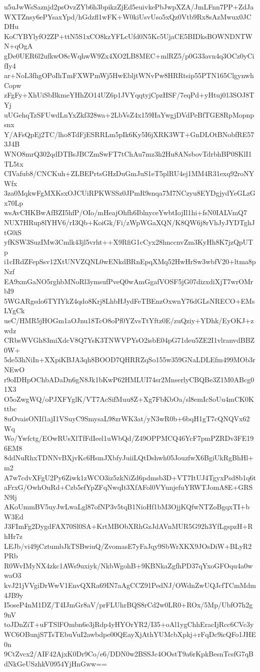 u5uJwWsSaznjd2psOvzZYb6h3bpikzZjEd5euivkePbJwpXZA/JmLFnn7PP+ZdJa
WXTZnsy6ePYsaxYpd/hGdzfl1wFK+W0kiUsvUso5xQz0Vtb9Rx8sAzMwux0JCDHu
KoCYBYlyfO2ZP+ttN5S1xCO8kzYFLcUfd0N5Kc5UjaCE5BIDksBOWNDNTWN+qOgA
gDe0UER6l2ufkwO8cWqhwW9Zx4XO2LB8MEC+mlRZ5/p0G33avn4q3OCz0yCifIy4
ar+NoL3fhgOPoIhTmFXWPmWj5HwEbljtWNvPw8HRRtsip55PTN165ClgynwhCopw
zFgFy+XhUiSbBkmeYHhZO14UZ6p1JVYqqtyjCpzHSF/7eqPd+yHtuj013SOJ8TYj
uUGehqTzSFUwdLnYxZkf328wa+2LbVsZ4x159HaYwgjDVdPeBfTGE8RpMopnpsnx
Y/AFsQpEj2TC/lho8TdFjESRRLm5pIk6Ky5I6jXRK3WT+GnDLOtBNobfRE573J4B
WNO8mrQ302qdDTBsJBCZmSwFT7tChAu7mz3h2Hu8ANsbovTdrbhBP0SKlI1TL5tx
CIVafub8/CNCKuh+ZLBEPrtsGHzDuGmJuS1eT5plRU4ej1MM4R31exq92roNYWfx
3za0MqkwFgMXKsxOJCUiRPKWSSz0JPmR9snqa7M7NCzyu8EYDgjydYeGLzGx70Lp
wsAvCHKBwAfBZI5hfP/OIo/mHeajOhfh6IblnyceYwbtIojIl1hi+fsN0IALVmQ7
NUX7HRup8lYHV6/rI3Qb+KoiGk/Fi/zWpWGaXQN/K8QW6j8rVhJyJYDTghJtG0iS
yfKSW3SuzIMw3Cmlk43jl5vrht++X9RfiG1cCyx28hnccnvZm3KyHh8K7jzQpUTp
i1cIRdZFepSsv12XtUNVZQNL0wENkdBRnEpqXMq52HwHrSw3wbfV20+ltma8pNzf
EA9xmGaNO5rghbMNoRl3ymsufPveQ0wAmGgafVOSF5jG07dizxdiXjT7wrOMrbI9
5WGARgsdo6TYIYkZ4qdo8Krj8LhbHJydFeTBEnzOxwnY76dGLsNRECO+EMsLYgCk
ueC/HMR5jHOGm1aOJnu18TcO8oPf0YZvsTtYftz0E/zuQziy+YDhk/EyOKJ+zwdz
CRbsWVGh83miXdcV8Q7YsK3TNWVPYsO2isbE04pG71deu5ZE2I1vlranvdBBZ0W+
5de53hNiIn+XXpiKBJA3qh8BOOD7QHRRZqSo155w359GNaLDLEfm499MOb3rNEwO
r9oIDHpOChbADaDn6gN8Jk1bKwP62HMLUI74sr2MnserlyCBQBe3Z1M0ABcg01X3
O5oZwgWQ/oPJXFYglK/VT7AcSifMuu8Z+Xg7FbKbOa/sl8emIcSoUu4mCK0Kttbc
8uOvaisONIf1ajI1VSuyC9SmysaL98zrWK3at/yN3wR0b+6bqH1gT7cQNQVx62Wq
Wo/Ywfctg/EOwRUsXlTfFdIeel1uWbQd/Z49OPPMCQ46YcF7pmPZRDv3FE196EM8
8ddNuRhxTDNNvBXjvKc6HsmJXbfyJuiiLQtDshwh05JouzfwX6BgiUkRgBhHl+m2
A7w7cdvXFgU2Py6Ziwk1zWCO3iz5zkNiZd6pdmsb3D+VT7ItUJ4TgyxPsd8b1q6t
aFrxG/OwhOuRd+Czb5efYpZFqNwqIt3XfAFol0VYunjefuYRWTJomA8E+GRSN9lj
AKoUmmBV5uyJwLwaLgl87ofNP3v5tqB1NioHf1bM3OjjKQfwNTZoBgqxTI+bW3Ed
J3FImFg2DygdFAX70Sl0SA+KrtMBObXRhGzJdAVnMUR5G92h3YfLgspzH+RhHr7z
LEJb/vi49jCztumbJkTSBwiuQ/ZvomasE7yFaJqy9SbWrXKX9JOsDiW+BLyR2PRb
R0WvIMyNX4zkc1AWs9uxiyk/NkbWgohB+9KBNkaZgfhPD37qYxoGFOqu4a0wwaO3
kvJ21jVVgiDrWwV1EnvQXRa69IN7aAgCCZ91PedNJ/OWdnZwUQJcfTCmMdm4JB9y
I5oseP4nM1DZ/T4IJmGr8aV/prFLUhrBQS8rCd2w0LR0+ROx/5Mp/UbfO7h2g9nV
toJDnZiT+uFTSlFOmbn6e3jRdp4yHYOrYR2/I35+oAl1ygChhEracIjRcc6CVc3y
WC6OBunjS7TsTEbuVuI2awbdpe00QEayXjAthYUMcbXpkj+rFqDc9icQFo1JHE0n
9CtZvcx2/AIF42AjxK0Dr9Co/e6/DDN0w2BSSJc4OOstT9a6rKpkBesnTcsfG7qB
dNkGeUSzhkV0954YjHnGww==
